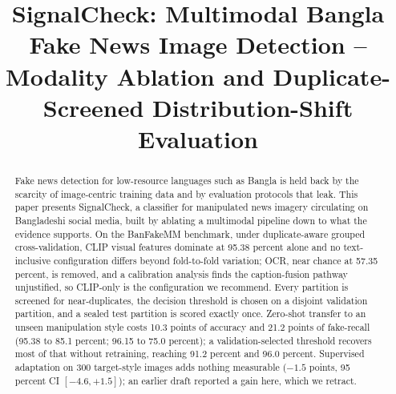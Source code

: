 \documentclass[conference,a4paper]{IEEEtran}
\newif\ifblindsubmission
\newcommand{\sysname}{SignalCheck}
\begin{document}
\title{\sysname: Multimodal Bangla Fake News Image Detection --
Modality Ablation and Duplicate-Screened Distribution-Shift Evaluation}

\ifblindsubmission
  \author{}
\else
  \author{
  \and
  \and
  }
\fi

\maketitle

\begin{abstract}
Fake news detection for low-resource languages such as Bangla is held back by
the scarcity of image-centric training data and by evaluation protocols that
leak. This paper presents \sysname, a classifier for manipulated news imagery
circulating on Bangladeshi social media, built by ablating a multimodal
pipeline down to what the evidence supports. On the BanFakeMM benchmark, under
duplicate-aware grouped cross-validation, CLIP visual features dominate at
95.38 percent alone and no text-inclusive configuration differs beyond
fold-to-fold variation; OCR, near chance at 57.35 percent, is removed, and a
calibration analysis finds the caption-fusion pathway unjustified, so CLIP-only
is the configuration we recommend. Every
partition is screened for near-duplicates, the decision threshold is chosen on
a disjoint validation partition, and a sealed test partition is scored exactly
once. Zero-shot transfer to an unseen manipulation style costs 10.3 points of
accuracy and 21.2 points of fake-recall (95.38 to 85.1 percent; 96.15 to
75.0 percent); a validation-selected threshold recovers most of that without
retraining, reaching 91.2 percent and 96.0 percent. Supervised adaptation on
300 target-style images adds nothing measurable ($-1.5$ points, 95 percent CI
$[-4.6, +1.5]$); an earlier draft reported a gain here, which we retract.
\end{abstract}
\end{document}
